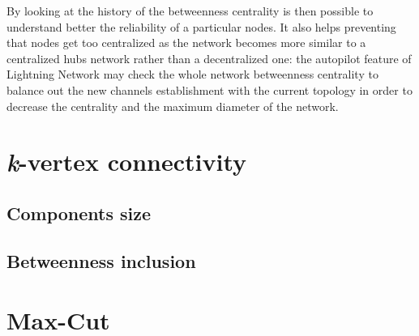 	By looking at the history of the betweenness centrality is then possible to understand better the reliability of a particular nodes. It also helps preventing that nodes get too centralized as the network becomes more similar to a centralized hubs network rather than a decentralized one: the autopilot feature of Lightning Network may check the whole network betweenness centrality to balance out the new channels establishment with the current topology in order to decrease the centrality and the maximum diameter of the network.
	
	\section{\textit{k}-vertex connectivity}
	\subsection{Components size}
	\subsection{Betweenness inclusion}
	\section{Max-Cut}
